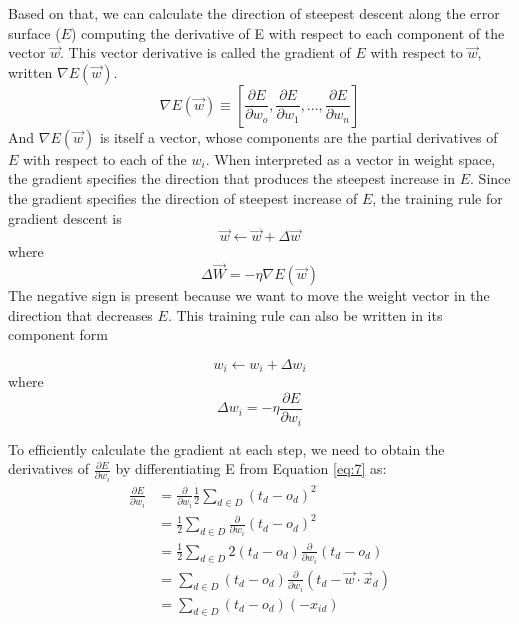 \documentclass{article}
\begin{document}
Based on that, we can calculate the direction of steepest descent along the error surface ($E$) computing the derivative of E with respect to each component of the vector $\Vec{w}$. This vector derivative is called the gradient of $E$ with respect to $\Vec{w}$, written $\nabla E(\Vec{w})$.
\begin{equation}
    \nabla E(\Vec{w}) \equiv 
    \left[ \frac{\partial E}{\partial w_o}, \frac{\partial E}{\partial w_1}, ..., \frac{\partial E}{\partial w_n} \right]
\end{equation}
And $\nabla E(\Vec{w})$ is itself a vector, whose components are the partial derivatives of $E$ with respect to each of the $w_i$. When interpreted as a vector in weight space, the gradient specifies the direction that produces the steepest increase in $E$.
Since the gradient specifies the direction of steepest increase of $E$, the training rule for gradient descent is 
\begin{equation}
    \Vec{w} \leftarrow \Vec{w} + \Delta \Vec{w}
\end{equation}
where
\begin{equation}
    \Delta \Vec{W} = - \eta \nabla E(\Vec{w})
\end{equation}
The negative sign is present because we want to move the weight vector in the direction that decreases $E$. This training rule can also be written in its component form

\begin{equation}
    w_i \leftarrow w_i + \Delta w_i
\end{equation}
where
\begin{equation}
    \Delta w_i = -\eta\frac{\partial E}{\partial w_i}
\end{equation}

To efficiently calculate the gradient at each step, we need to obtain the derivatives of $\frac{\partial E}{\partial w_i}$ by differentiating E from Equation \ref{eq:7} as:
\begin{equation}
    \begin{split}
        \frac{\partial E}{\partial w_i} &= \frac{\partial}{\partial w_i} \frac{1}{2} \sum_{d \in D} (t_d - o_d)^2 \\
        &= \frac{1}{2} \sum_{d \in D} \frac{\partial}{\partial w_i} (t_d - o_d)^2 \\
        &= \frac{1}{2} \sum_{d \in D} 2 (t_d - o_d) \frac{\partial}{\partial w_i} (t_d - o_d) \\
        &= \sum_{d \in D} (t_d - o_d) \frac{\partial}{\partial w_i} (t_d - \vec{w} \cdot \vec{x}_d) \\
        &= \sum_{d \in D} (t_d - o_d)(-x_{id})
    \end{split}
\end{equation}
\end{document}
